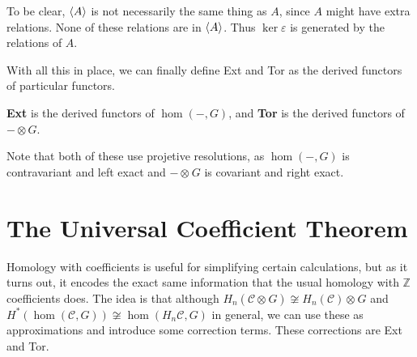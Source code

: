 \documentclass[twoside,10pt]{article}
\begin{document}
\begin{note}[]
To be clear, $\left\langle A \right\rangle$ is not necessarily the same thing as $A$, since $A$ might have extra relations. None of these relations are in $\left\langle A \right\rangle$. Thus $\ker \varepsilon$ is generated by the relations of $A$.
\end{note}

\begin{cor}
\end{cor}


With all this in place, we can finally define Ext and Tor as the derived functors of particular functors.

\begin{defn}[]
	\textbf{Ext} is the derived functors of $\hom(-,G)$, and \textbf{Tor} is the derived functors of $-\otimes G$.
\end{defn}

Note that both of these use projetive resolutions, as $\hom(-,G)$ is contravariant and left exact and $-\otimes_{}G$ is covariant and right exact. 


\section{The Universal Coefficient Theorem}

Homology with coefficients is useful for simplifying certain calculations, but as it turns out, it encodes the exact same information that the usual homology with $\mathbb{Z}$ coefficients does. The idea is that although $H_{n}(\mathcal{C} \otimes_{}G) \not\cong H_{n}(\mathcal{C}) \otimes_{}G$ and $H^{*}(\hom(\mathcal{C},G)) \not\cong \hom(H_{n}\mathcal{C},G)$ in general, we can use these as approximations and introduce some correction terms. These corrections are Ext and Tor.
\end{document}

